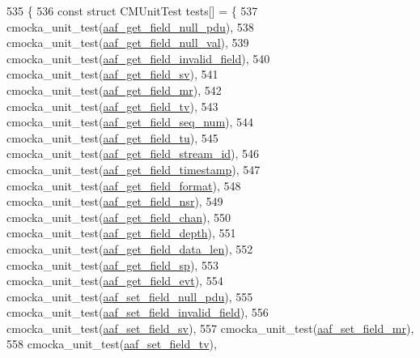 \begin{DoxyCode}
535 \{
536     \textcolor{keyword}{const} \textcolor{keyword}{struct }CMUnitTest tests[] = \{
537         cmocka\_unit\_test(\hyperlink{test-aaf_8c_a75facf8c2c4fddd477fa47494275e969}{aaf\_get\_field\_null\_pdu}),
538         cmocka\_unit\_test(\hyperlink{test-aaf_8c_a6458b9edde5be98c38e55b696f7040f1}{aaf\_get\_field\_null\_val}),
539         cmocka\_unit\_test(\hyperlink{test-aaf_8c_a054bb74ce98e26ae469dd4a276199b7a}{aaf\_get\_field\_invalid\_field}),
540         cmocka\_unit\_test(\hyperlink{test-aaf_8c_a08d8dd939835e3fbcead2f7e1b565080}{aaf\_get\_field\_sv}),
541         cmocka\_unit\_test(\hyperlink{test-aaf_8c_a193c8c98b601c2f340da5917f0d76aef}{aaf\_get\_field\_mr}),
542         cmocka\_unit\_test(\hyperlink{test-aaf_8c_af3fe938b79f95379ef102e6fcb79a05c}{aaf\_get\_field\_tv}),
543         cmocka\_unit\_test(\hyperlink{test-aaf_8c_a8310180bf237665f879b2894bdd4ab2c}{aaf\_get\_field\_seq\_num}),
544         cmocka\_unit\_test(\hyperlink{test-aaf_8c_aa66b93a88e5f409a1b05a9b0eb838711}{aaf\_get\_field\_tu}),
545         cmocka\_unit\_test(\hyperlink{test-aaf_8c_a6a17b66f03bb1f1a9d18ca5523a892a4}{aaf\_get\_field\_stream\_id}),
546         cmocka\_unit\_test(\hyperlink{test-aaf_8c_a1ae5f104cb632794ffb6260429d9526c}{aaf\_get\_field\_timestamp}),
547         cmocka\_unit\_test(\hyperlink{test-aaf_8c_ab87ddb0c54f5f45557b6567db2e16012}{aaf\_get\_field\_format}),
548         cmocka\_unit\_test(\hyperlink{test-aaf_8c_aafc809db6c29ba25762ab1028f8a6a26}{aaf\_get\_field\_nsr}),
549         cmocka\_unit\_test(\hyperlink{test-aaf_8c_ae21ae6143c92aa007dd7a7867eb7b3ac}{aaf\_get\_field\_chan}),
550         cmocka\_unit\_test(\hyperlink{test-aaf_8c_a1e58986898dc1443389595b501143af3}{aaf\_get\_field\_depth}),
551         cmocka\_unit\_test(\hyperlink{test-aaf_8c_a75cc6966b1c2691a80e8481596a1274e}{aaf\_get\_field\_data\_len}),
552         cmocka\_unit\_test(\hyperlink{test-aaf_8c_a290b4c9a892260bd62e93fa9e1580910}{aaf\_get\_field\_sp}),
553         cmocka\_unit\_test(\hyperlink{test-aaf_8c_a525155e10b535fe40f8c4d251df2a115}{aaf\_get\_field\_evt}),
554         cmocka\_unit\_test(\hyperlink{test-aaf_8c_ad69456352d02b92ba5fb6b2bca933534}{aaf\_set\_field\_null\_pdu}),
555         cmocka\_unit\_test(\hyperlink{test-aaf_8c_a868f2139ae94e754cbf4345f4e32094d}{aaf\_set\_field\_invalid\_field}),
556         cmocka\_unit\_test(\hyperlink{test-aaf_8c_abeca38beedbf510c81553827294f8051}{aaf\_set\_field\_sv}),
557         cmocka\_unit\_test(\hyperlink{test-aaf_8c_ab2e163995b190924ff502301b23cb18f}{aaf\_set\_field\_mr}),
558         cmocka\_unit\_test(\hyperlink{test-aaf_8c_aedf460af1ef590b389e94be42e2d57a9}{aaf\_set\_field\_tv}),

\end{DoxyCode}
